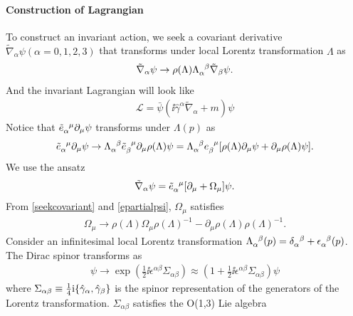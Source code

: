 \documentclass[10pt]{article}
\begin{document}
\paragraph{Construction of Lagrangian}
To construct an invariant action, we seek a covariant derivative $\tilde{\nabla}_\alpha \psi (\alpha=0,1,2,3)$ that transforms under local Lorentz transformation $\Lambda$ as
\begin{align}
    \tilde{\nabla}_\alpha\psi\to\rho(\Lambda)\tensor{\Lambda}{_\alpha^\beta}\tilde{\nabla}_\beta\psi.\label{seekcovariant}
\end{align}
And the invariant Lagrangian will look like
\begin{align}
    \mathcal{L}=\bar{\psi}(\ii\hat{\gamma}^\alpha\tilde{\nabla}_\alpha+m)\psi
\end{align}
Notice that $\tensor{\tilde{e}}{_\alpha^\mu}\partial_\mu\psi$ transforms under $\Lambda(p)$ as
\begin{align}
    \tensor{\tilde{e}}{_\alpha^\mu}\partial_\mu\psi\to\tensor{\Lambda}{_\alpha^\beta}\tensor{\tilde{e}}{_\beta^\mu}\partial_\mu\rho(\Lambda)\psi=\tensor{\Lambda}{_\alpha^\beta}\tensor{e}{_\beta^\mu}[\rho(\Lambda)\partial_\mu\psi+\partial_\mu\rho(\Lambda)\psi].\label{epartialpsi}
\end{align}
We use the ansatz
\begin{align}
    \tilde{\nabla}_\alpha\psi=\tensor{\tilde{e}}{_\alpha^\mu}[\partial_\mu+\Omega_\mu]\psi.
\end{align}
From \eqref{seekcovariant} and \eqref{epartialpsi}, $\Omega_\mu$ satisfies
\begin{align}
    \Omega_\mu\to\rho(\Lambda)\Omega_\mu\rho(\Lambda)^{-1}-\partial_\mu\rho(\Lambda)\rho(\Lambda)^{-1}.\label{omegamu}
\end{align}
Consider an infinitesimal local Lorentz transformation $\tensor{\Lambda}{_\alpha^\beta}(p)=\tensor{\delta}{_\alpha^\beta}+\tensor{\epsilon}{_\alpha^\beta}(p)$.
The Dirac spinor transforms as
\begin{align}
    \psi\to\exp(\frac{1}{2}\ii\epsilon^{\alpha\beta}\Sigma_{\alpha\beta})\approx\left(1+\frac{1}{2}\ii\epsilon^{\alpha\beta}\Sigma_{\alpha\beta}\right)\psi
\end{align}
where $\Sigma_{\alpha\beta}\equiv\frac{1}{4}\ii\acomm{\hat{\gamma}_\alpha}{\hat{\gamma}_\beta}$ is the spinor representation of the generators of the Lorentz transformation.
$\Sigma_{\alpha\beta}$ satisfies the O(1,3) Lie algebra
\end{document}
